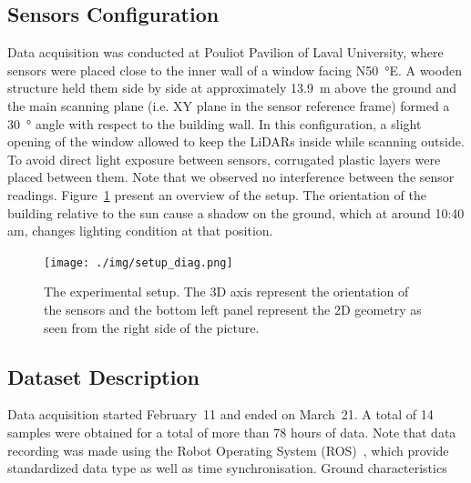 \subsection{Sensors Configuration} %
Data acquisition was conducted at Pouliot Pavilion of Laval University, where sensors were placed close to the inner wall of a window facing N\SI{50}{\degree}E. A wooden structure held them side by side at approximately \SI{13.9}{\meter} above the ground and the main scanning plane (i.e. XY plane in the sensor reference frame) formed a \SI{30}{\degree} angle with respect to the building wall. In this configuration, a slight opening of the window allowed to keep the LiDARs inside while scanning outside. To avoid direct light exposure between sensors, corrugated plastic layers were placed between them. Note that we observed no interference between the sensor readings. Figure~\ref{fig:setup} present an overview of the setup. The orientation of the building relative to the sun cause a shadow on the ground, which at around 10:40 am, changes lighting condition at that position. 

\begin{figure}[h]
    \centering
    \texttt{[image: ./img/setup\_diag.png]}
    \caption{The experimental setup. The 3D axis represent the orientation of the sensors and the bottom left panel represent the 2D geometry as seen from the right side of the picture.}
    \label{fig:setup}
\end{figure}


\subsection{Dataset Description} %
Data acquisition started February~11 and ended on March~21. A total of 14 samples were obtained for a total of more than 78 hours of data.
Note that data recording was made using the Robot Operating System (ROS)~\cite{ROSWeb}, which provide standardized data type as well as time synchronisation.
Ground characteristics

